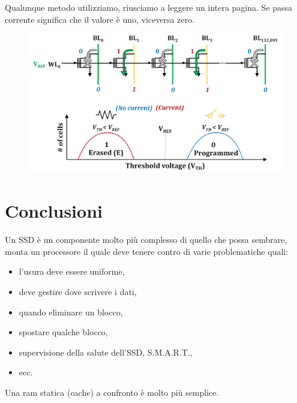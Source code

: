 Qualunque metodo utilizziamo, riusciamo a leggere un intera pagina. Se passa corrente significa che il valore è uno, viceversa zero.


\begin{figure}[htbp]
    \centering
    \includegraphics[width=0.6\linewidth]{img/amrytg.png}
\end{figure}


\section{Conclusioni}

Un SSD è un componente molto più complesso di quello che possa sembrare, monta un processore il quale deve tenere contro di varie problematiche quali:

\begin{itemize}
    \item l'usura deve essere uniforme,
    \item deve gestire dove scrivere i dati,
    \item quando eliminare un blocco,
    \item spostare qualche blocco,
    \item supervisione della salute dell'SSD, S.M.A.R.T.,
    \item ecc.
\end{itemize}

Una ram statica (cache) a confronto è molto più semplice.


